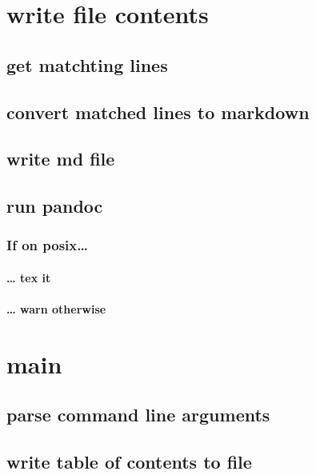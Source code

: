 \documentclass[]{article}
\let\oldparagraph\paragraph
\renewcommand{\paragraph}[1]{\oldparagraph{#1}\mbox{}}
\begin{document}
\section{write file contents}\label{write-file-contents}

\subsection{get matchting lines}\label{get-matchting-lines}

\subsection{convert matched lines to
markdown}\label{convert-matched-lines-to-markdown}

\subsection{write md file}\label{write-md-file}

\subsection{run pandoc}\label{run-pandoc}

\subsubsection{If on posix\ldots{}}\label{if-on-posix}

\paragraph{\ldots{} tex it}\label{tex-it}

\paragraph{\ldots{} warn otherwise}\label{warn-otherwise}

\section{main}\label{main}

\subsection{parse command line
arguments}\label{parse-command-line-arguments}

\subsection{write table of contents to
file}\label{write-table-of-contents-to-file}
\end{document}
